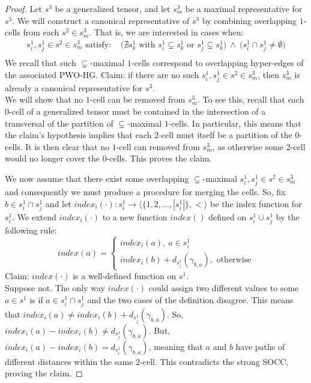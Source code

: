 \documentclass[10pt,a4paper]{amsart}
\begin{document}
\begin{proof}
	Let $s^3$ be a generalized tensor, and let $s^3_m$ be a maximal representative for $s^3$. We will construct a canonical representative of $s^3$ by combining overlapping $1$-cells from each $s^2 \in s^3_m$. That is, we are interested in cases when:
	\begin{equation*}
		\begin{aligned}
			s^1_i, s^1_j \in s^2 \in s^3_m \text{ satisfy: }& \big( \nexists s^1_k \text{ with } s^1_i \subsetneq s^1_k \text{ or } s^1_j \subsetneq s^1_k \big) \ \wedge \ \big( s^1_i \cap s^1_j \neq \emptyset \big)\\
		\end{aligned}
	\end{equation*}
	We recall that such $\subsetneq$-maximal $1$-cells correspond to overlapping hyper-edges of the associated PWO-HG.
	Claim: if there are no such $s^1_i, s^1_j \in s^2 \in s^3_m$, then $s^3_m$ is already a canonical representative for $s^3$.\\
	We will show that no $1$-cell can be removed from $s^3_m$. To see this, recall that each $0$-cell of a generalized tensor must be contained in the intersection of a transversal of the partition of $\subsetneq$-maximal $1$-cells. In particular, this means that the claim's hypothesis implies that each $2$-cell must itself be a partition of the $0$-cells. It is then clear that no $1$-cell can removed from $s^3_m$, as otherwise some $2$-cell would no longer cover the $0$-cells. This proves the claim.
	
	We now assume that there exist some overlapping $\subsetneq$-maximal $s^1_i, s^1_j \in s^2 \in s^3_m$ and consequently we must produce a procedure for merging the cells. So, fix $b \in s^1_i \cap s^1_j$ and let $index_i(\cdot): s^1_i \rightarrow \big \langle \{1, 2, ..., |s^1_i|\}, < \big \rangle$ be the index function for $s^1_i$. We extend $index_i(\cdot)$ to a new function $index()$ defined on $s^1_i \cup s^1_j$ by the following rule:
	\begin{equation*}
		index(a) = \begin{cases}
			index_i(a), \ a \in s^1_i\\
			index_i(b) + d_{s^1_j}(\gamma_{b, a}), \text{ otherwise}
		\end{cases}
	\end{equation*}
	Claim: $index(\cdot)$ is a well-defined function on $s^1$.\\
	Suppose not. The only way $index(\cdot)$ could assign two different values to some $a \in s^1$ is if $a \in s^1_i \cap s^1_j$ and the two cases of the definition disagree. This means that $index_i(a) \neq index_i(b) + d_{s^1_j}(\gamma_{b, a})$. So, $index_i(a) - index_i(b) \neq d_{s^1_j}(\gamma_{b, a})$. But, $index_i(a) - index_i(b) = d_{s^1_i}(\gamma_{b, a})$, meaning that $a$ and $b$ have paths of different distances within the same $2$-cell. This contradicts the strong SOCC, proving the claim.
	

\end{proof}
\end{document}
